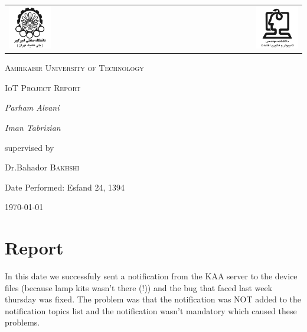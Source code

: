 \documentclass{article}
\begin{document}
\begin{titlepage}
	\centering
	\begin{tabular}{l r}
		\includegraphics[width=0.3\textwidth]{../AUT-CEIT-01.png}
		&
		\includegraphics[width=0.3\textwidth]{../AUT-CEIT-02.png}
	\end{tabular}
	\vspace{1cm}\par
	{\scshape\LARGE Amirkabir University of Technology \par}
	\vspace{1cm}
	{\scshape\Large IoT Project Report\par}
	\vspace{2cm}
	{\Large\itshape Parham Alvani\par}
	{\Large\itshape Iman Tabrizian\par}
	\vfill
	supervised by\par
	Dr.Bahador \textsc{Bakhshi}\par
    	Date Performed: Esfand 24, 1394
	\vfill
	{\large \today\par}
\end{titlepage}


\section*{Report}
In this date we successfuly sent a notification from the KAA server to the
device files (because lamp kits wasn't there (!)) and the bug that faced last week
thursday was fixed. The problem was that the notification was NOT added to the
notification topics list and the notification wasn't mandatory which caused these
problems.
\end{document}
